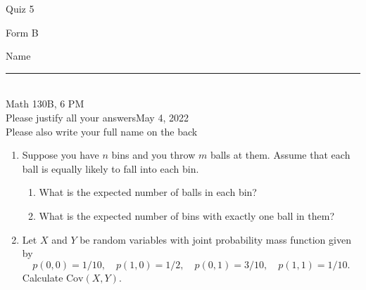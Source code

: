 \documentclass[12pt]{article}
\begin{document}
\begin{flushleft} 
\centerline{\LARGE{Quiz 5}} 
\vspace{5 mm}
{Form B}\hfill  
{Name \rule {2 in}{0.01in}}\\
Math 130B, 6 PM
\\
{Please justify all your answers}\hfill {May 4, 2022}
\\
{Please also write your full name on the back} 

\medskip
\end{flushleft}

\begin{enumerate}

	\item Suppose you have $n$ bins and you throw $m$ balls at them. Assume that each ball is equally likely to fall into each bin.
	\begin{enumerate}
		\item What is the expected number of balls in each bin?
		\vfill

		\item What is the expected number of bins with exactly one ball in them?
	\end{enumerate}

	\vfill


	\item Let $X$ and $Y$ be random variables with joint probability mass function given by
	\[
		p(0,0) = 1/10,\quad p(1,0) = 1/2,\quad p(0,1)=3/10,\quad p(1,1)=1/10.
	\]
	Calculate $\text{Cov}(X,Y)$.
	\vfill





	\vfill\null
\end{enumerate}
\end{document}
